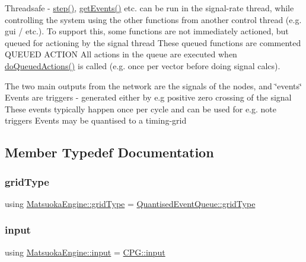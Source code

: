 Threadsafe -\/ \mbox{\hyperlink{classMatsuokaEngine_a4fa468dc0814f1ad92594f7a4d5abd00}{step()}}, \mbox{\hyperlink{classMatsuokaEngine_a70444163eee59d0df5b282bb8696f5a1}{get\+Events()}} etc. can be run in the signal-\/rate thread, while controlling the system using the other functions from another control thread (e.\+g. gui / etc.). To support this, some functions are not immediately actioned, but queued for actioning by the signal thread These queued functions are commented Q\+U\+E\+U\+ED A\+C\+T\+I\+ON All actions in the queue are executed when \mbox{\hyperlink{classMatsuokaEngine_affd6ef89f68c1aa654229a07e0160f2e}{do\+Queued\+Actions()}} is called (e.\+g. once per vector before doing signal calcs).

The two main outputs from the network are the signals of the nodes, and \char`\"{}events\char`\"{} Events are triggers -\/ generated either by e.\+g positive zero crossing of the signal These events typically happen once per cycle and can be used for e.\+g. note triggers Events may be quantised to a timing-\/grid 

\subsection{Member Typedef Documentation}
\mbox{\label{classMatsuokaEngine_aaf41ce5bf63099a1d864e4eb91527cb5}} 
\subsubsection{\texorpdfstring{grid\+Type}{gridType}}
{\footnotesize\ttfamily using \mbox{\hyperlink{classQuantisedEventQueue_ae186d50bd503038452edbbdd0c7c259e}{Matsuoka\+Engine\+::grid\+Type}} =  \mbox{\hyperlink{classQuantisedEventQueue_ae186d50bd503038452edbbdd0c7c259e}{Quantised\+Event\+Queue\+::grid\+Type}}}

\mbox{\label{classMatsuokaEngine_a811a5449f07004a2eb6b34e8c9bd862f}} 
\subsubsection{\texorpdfstring{input}{input}}
{\footnotesize\ttfamily using \mbox{\hyperlink{classMatsuokaEngine_a811a5449f07004a2eb6b34e8c9bd862f}{Matsuoka\+Engine\+::input}} =  \mbox{\hyperlink{structCPG_1_1input}{C\+P\+G\+::input}}}

